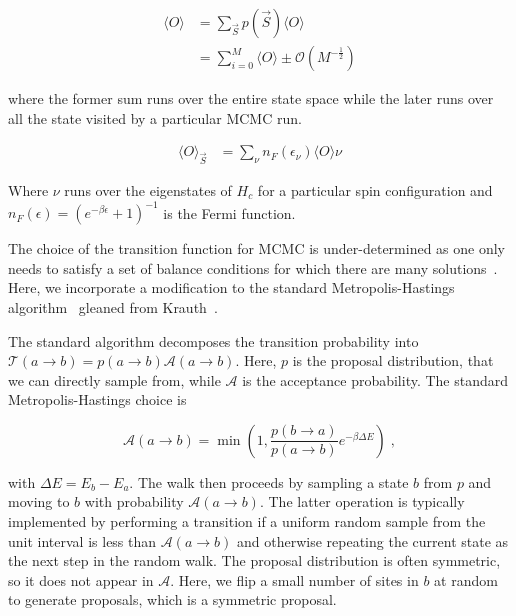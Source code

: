 \[\begin{aligned}
\label{eq:thermal_expectation}
\langle O \rangle & = \sum_{\vec{S}} p(\vec{S}) \langle O \rangle\\
                  & = \sum_{i = 0}^{M} \langle O\rangle \pm \mathcal{O}(M^{-\tfrac{1}{2}})
\end{aligned}\]

where the former sum runs over the entire state space while the later runs over all the state visited by a particular MCMC run.

\[\begin{aligned}
\langle O \rangle_{\vec{S}}& = \sum_{\nu} n_F(\epsilon_{\nu}) \langle O \rangle{\nu}
\end{aligned}\]

Where \(\nu\) runs over the eigenstates of \(H_c\) for a particular spin configuration and \(n_F(\epsilon) = \left(e^{-\beta\epsilon} + 1\right)^{-1}\) is the Fermi function.

The choice of the transition function for MCMC is under-determined as one only needs to satisfy a set of balance conditions for which there are many solutions~\autocite{kellyReversibilityStochasticNetworks1981}. Here, we incorporate a modification to the standard Metropolis-Hastings algorithm~\autocite{hastingsMonteCarloSampling1970} gleaned from Krauth~\autocite{krauthIntroductionMonteCarlo1998}.

The standard algorithm decomposes the transition probability into \(\mathcal{T}(a \to b) = p(a \to b)\mathcal{A}(a \to b)\). Here, \(p\) is the proposal distribution, that we can directly sample from, while \(\mathcal{A}\) is the acceptance probability. The standard Metropolis-Hastings choice is

\[\mathcal{A}(a \to b) = \min\left(1, \frac{p(b\to a)}{p(a\to b)} e^{-\beta \Delta E}\right)\;,\]

with \(\Delta E = E_b - E_a\). The walk then proceeds by sampling a state \(b\) from \(p\) and moving to \(b\) with probability \(\mathcal{A}(a \to b)\). The latter operation is typically implemented by performing a transition if a uniform random sample from the unit interval is less than \(\mathcal{A}(a \to b)\) and otherwise repeating the current state as the next step in the random walk. The proposal distribution is often symmetric, so it does not appear in \(\mathcal{A}\). Here, we flip a small number of sites in \(b\) at random to generate proposals, which is a symmetric proposal.

